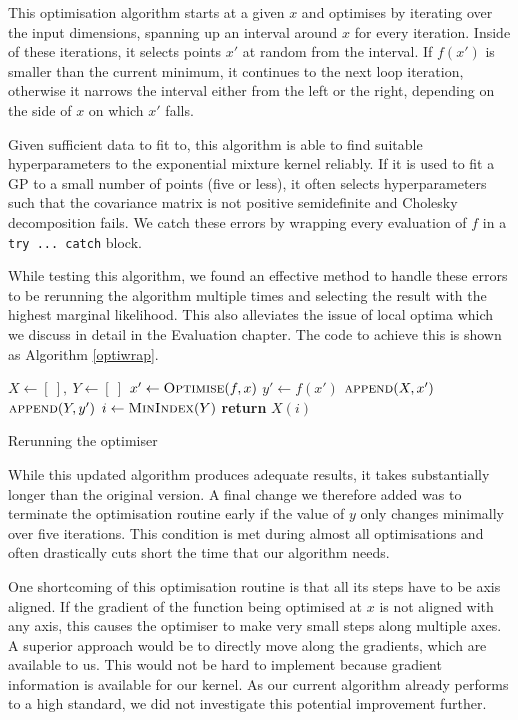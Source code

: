 \documentclass[a4paper,12pt,twoside,openright]{report}
\begin{document}
This optimisation algorithm starts at a given $x$ and optimises by iterating over the input dimensions, spanning up an interval around $x$ for every iteration. Inside of these iterations, it selects points $x'$ at random from the interval. If $f(x')$ is smaller than the current minimum, it continues to the next loop iteration, otherwise it narrows the interval either from the left or the right, depending on the side of $x$ on which $x'$ falls.

Given sufficient data to fit to, this algorithm is able to find suitable hyperparameters to the exponential mixture kernel reliably. If it is used to fit a GP to a small number of points (five or less), it often selects hyperparameters such that the covariance matrix is not positive semidefinite and Cholesky decomposition fails. We catch these errors by wrapping every evaluation of $f$ in a \texttt{try ... catch} block. 

While testing this algorithm, we found an effective method to handle these errors to be rerunning the algorithm multiple times and selecting the result with the highest marginal likelihood. This also alleviates the issue of local optima which we discuss in detail in the Evaluation chapter. The code to achieve this is shown as Algorithm \ref{optiwrap}.

\begin{algorithm}
\begin{algorithmic}[1]
\State $X \gets [\ ],\ Y \gets [\ ]$
\State $x'\gets \Call{Optimise}{f, x}$
\State $y'\gets f(x')$
\State $\Call{append}{X, x'}$
\State $\Call{append}{Y, y'}$
\EndFor
\State $i\gets \Call{MinIndex}{Y}$
\State \textbf{return} $X(i)$
\EndProcedure
\end{algorithmic}
\caption{Rerunning the optimiser}
\label{optiwrap}
\end{algorithm}

While this updated algorithm produces adequate results, it takes substantially longer than the original version. A final change we therefore added was to terminate the optimisation routine early if the value of $y$ only changes minimally over five iterations. This condition is met during almost all optimisations and often drastically cuts short the time that our algorithm needs.

One shortcoming of this optimisation routine is that all its steps have to be axis aligned. If the gradient of the function being optimised at $x$ is not aligned with any axis, this causes the optimiser to make very small steps along multiple axes. A superior approach would be to directly move along the gradients, which are available to us. This would not be hard to implement because gradient information is available for our kernel. As our current algorithm already performs to a high standard, we did not investigate this potential improvement further.
\end{document}
